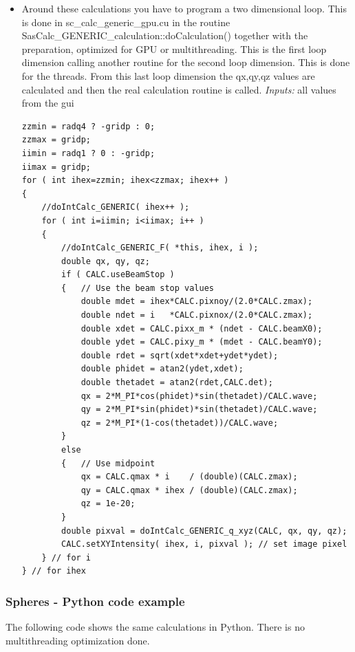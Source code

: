 \documentclass[11pt]{article} %
\begin{document}
\begin{itemize}
\item Around these calculations you have to program a two dimensional loop. This is done in sc\_calc\_generic\_gpu.cu in the routine SasCalc\_GENERIC\_calculation::doCalculation() together with the preparation, optimized for GPU or multithreading. This is the first loop dimension calling another routine for the second loop dimension. This is done for the threads. From this last loop dimension the qx,qy,qz values are calculated and then the real calculation routine is called.
{\it Inputs:} all values from the gui
\begin{lstlisting}[frame=single]
zzmin = radq4 ? -gridp : 0;
zzmax = gridp;
iimin = radq1 ? 0 : -gridp;
iimax = gridp;
for ( int ihex=zzmin; ihex<zzmax; ihex++ )
{
    //doIntCalc_GENERIC( ihex++ );
    for ( int i=iimin; i<iimax; i++ )
    {
        //doIntCalc_GENERIC_F( *this, ihex, i );
        double qx, qy, qz;
        if ( CALC.useBeamStop )
        {   // Use the beam stop values
            double mdet = ihex*CALC.pixnoy/(2.0*CALC.zmax);
            double ndet = i   *CALC.pixnox/(2.0*CALC.zmax);
            double xdet = CALC.pixx_m * (ndet - CALC.beamX0);
            double ydet = CALC.pixy_m * (mdet - CALC.beamY0);
            double rdet = sqrt(xdet*xdet+ydet*ydet);
            double phidet = atan2(ydet,xdet);
            double thetadet = atan2(rdet,CALC.det);
            qx = 2*M_PI*cos(phidet)*sin(thetadet)/CALC.wave;
            qy = 2*M_PI*sin(phidet)*sin(thetadet)/CALC.wave;
            qz = 2*M_PI*(1-cos(thetadet))/CALC.wave;
        }
        else
        {   // Use midpoint
            qx = CALC.qmax * i    / (double)(CALC.zmax);
            qy = CALC.qmax * ihex / (double)(CALC.zmax);
            qz = 1e-20;
        }
        double pixval = doIntCalc_GENERIC_q_xyz(CALC, qx, qy, qz);
        CALC.setXYIntensity( ihex, i, pixval ); // set image pixel
    } // for i
} // for ihex
\end{lstlisting}

\end{itemize}



\subsubsection{Spheres - Python code example}

The following code shows the same calculations in Python. There is no multithreading optimization done.
\end{document}
